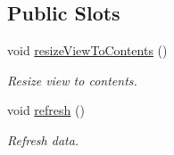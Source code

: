 \subsection*{Public Slots}
\begin{DoxyCompactItemize}
\item 
void \hyperlink{classmdt_sql_table_widget_a2afd70df3855ecf14f86713646ec2763}{resize\-View\-To\-Contents} ()
\begin{DoxyCompactList}\small\item\em Resize view to contents. \end{DoxyCompactList}\item 
void \hyperlink{classmdt_sql_table_widget_a5145e57ff2361ad845c37dde16dfecac}{refresh} ()
\begin{DoxyCompactList}\small\item\em Refresh data. \end{DoxyCompactList}\end{DoxyCompactItemize}
